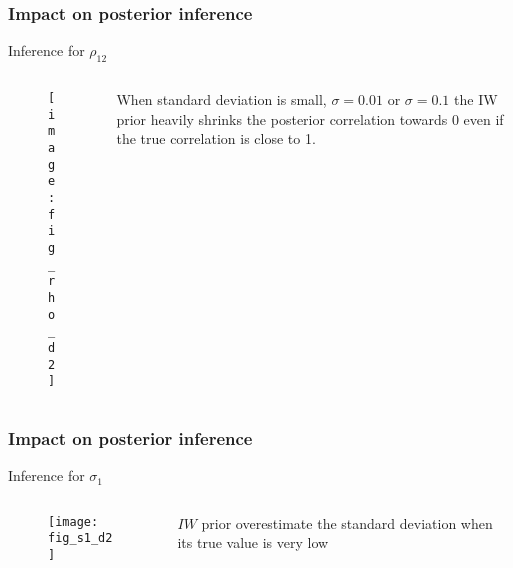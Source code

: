 \documentclass[9pt]{beamer}\usepackage[]{graphicx}\usepackage[]{color}
\begin{document}
\begin{frame}
\frametitle{Impact on posterior inference}
Inference for $\rho_{12}$
	\begin{columns}
	 \begin{column}{7cm}
		 \begin{figure}[hbtp]
		   \texttt{[image: fig\_rho\_d2]} 
		\end{figure}
	\end{column}
	\begin{column}{4cm}
	When standard deviation is small, $\sigma=0.01$ or $\sigma=0.1$ the IW prior heavily shrinks the posterior correlation towards 0 even if the true correlation is close to 1. 
	\end{column}
	\end{columns}
\end{frame}

\begin{frame}
\frametitle{Impact on posterior inference}
Inference for $\sigma_1$
	\begin{columns}
	 \begin{column}{7cm}
\begin{figure}[htbp]
   \texttt{[image: fig\_s1\_d2]} 
\end{figure}
	\end{column}
	\begin{column}{4cm}
$IW$ prior overestimate the standard deviation when its true value is very low
 	\end{column}
	\end{columns}
\end{frame}
\end{document}
